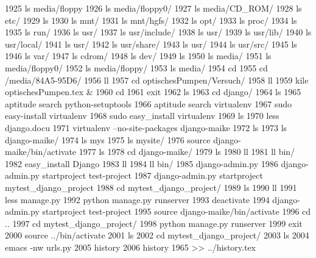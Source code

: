  1925  ls media/floppy
 1926  ls media/floppy0/
 1927  ls media/CD_ROM/
 1928  ls etc/
 1929  ls
 1930  ls mnt/
 1931  ls mnt/hgfs/
 1932  ls opt/
 1933  ls proc/
 1934  ls
 1935  ls run/
 1936  ls usr/
 1937  ls usr/include/
 1938  ls usr/
 1939  ls usr/lib/
 1940  ls usr/local/
 1941  ls usr/
 1942  ls usr/share/
 1943  ls usr/
 1944  ls usr/src/
 1945  ls
 1946  ls var/
 1947  ls cdrom/
 1948  ls dev/
 1949  ls
 1950  ls media/
 1951  ls media/floppy0/
 1952  ls media/floppy/
 1953  ls media/
 1954  cd
 1955  cd /media/84A5-95D6/
 1956  ll
 1957  cd optischesPumpen/Versuch/
 1958  ll
 1959  kile optischesPumpen.tex &
 1960  cd
 1961  exit
 1962  ls 
 1963  cd django/
 1964  ls
 1965  aptitude search python-setuptools
 1966  aptitude search virtualenv
 1967  sudo easy-install virtualenv
 1968  sudo easy_install virtualenv
 1969  ls
 1970  less django.docu
 1971  virtualenv --no-site-packages django-maike
 1972  ls
 1973  ls django-maike/
 1974  ls mys
 1975  ls mysite/
 1976  source django-maike/bin/activate
 1977  ls
 1978  cd django-maike/
 1979  ls
 1980  ll
 1981  ll bin/
 1982  easy_install Django
 1983  ll
 1984  ll bin/
 1985  django-admin.py 
 1986  django-admin.py startproject test-project
 1987  django-admin.py startproject mytest_django_project
 1988  cd mytest_django_project/
 1989  ls
 1990  ll
 1991  less manage.py 
 1992  python manage.py runserver
 1993  deactivate
 1994  django-admin.py startproject test-project
 1995  source django-maike/bin/activate
 1996  cd ..
 1997  cd mytest_django_project/
 1998  python manage.py runserver
 1999  exit
 2000  source ../bin/activate
 2001  ls
 2002  cd mytest_django_project/
 2003  ls
 2004  emacs -nw urls.py
 2005  history 
 2006  history 1965 >> ../history.tex 
